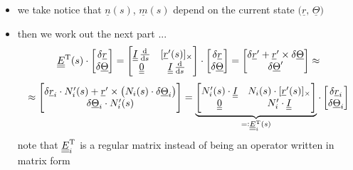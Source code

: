 \begin{frame}
  \begin{itemize}
    \item we take notice that $\underline{n}(s)$, $\underline{m}(s)$ depend on the current state $\bigl( \underline{r}, \, \underline{\Theta} \bigr)$
    \item then we work out the next part ...
      \begin{displaymath}
        \doubleunderline{E}^{\mathrm{T}}(s) \cdot
        \begin{bmatrix}
          \delta \underline{r} \\ \delta \underline{\Theta}
        \end{bmatrix} =
        \begin{bmatrix}
          \doubleunderline{I} \, \od{}{s} & [ \underline{r}^{\prime}(s) ]_{\times} \\
          \doubleunderline{0}             & \doubleunderline{I} \, \od{}{s}
        \end{bmatrix} \cdot
        \begin{bmatrix}
          \delta \underline{r} \\ \delta \underline{\Theta}
        \end{bmatrix} =
        \begin{bmatrix}
          \delta \underline{r}^{\prime} + \underline{r}^{\prime} \times \delta \underline{\Theta} \\
          \delta \underline{\Theta}^{\prime}
        \end{bmatrix} \approx
      \end{displaymath}
      \begin{displaymath}
        \approx
        \begin{bmatrix}
          \delta \underline{r}_i \cdot N_i^{\prime}(s) + \underline{r}^{\prime} \times \left( N_i(s) \cdot \delta \underline{\Theta}_i \right) \\
          \delta \underline{\Theta}_i \cdot N_i^{\prime}(s)
        \end{bmatrix} =
        \underbrace{
        \begin{bmatrix}
          N_i^{\prime}(s) \cdot \underline{\underline{I}}  & N_i(s) \cdot [\underline{r}^{\prime}(s)]_{\times} \\
          \underline{\underline{0}}                     & N_i^{\prime} \cdot \underline{\underline{I}}
        \end{bmatrix} }_{=: \underline{\underline{E}}_i^{\mathrm{T}}(s)} \cdot
        \begin{bmatrix}
          \delta \underline{r}_i \\
          \delta \underline{\Theta}_i
        \end{bmatrix}
      \end{displaymath}
    note that $\underline{\underline{E}}_i^{\mathrm{T}}$ is a regular matrix instead of being an operator written in matrix form
  \end{itemize}
\end{frame}



